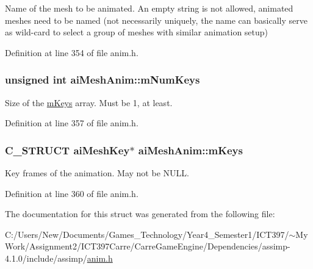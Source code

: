 Name of the mesh to be animated. An empty string is not allowed, animated meshes need to be named (not necessarily uniquely, the name can basically serve as wild-card to select a group of meshes with similar animation setup) 

Definition at line 354 of file anim.h.\hypertarget{structai_mesh_anim_a8702d42bf619ccc8414a556f41634d8}{
\subsubsection[mNumKeys]{\setlength{\rightskip}{0pt plus 5cm}unsigned int {\bf aiMeshAnim::mNumKeys}}}
\label{structai_mesh_anim_a8702d42bf619ccc8414a556f41634d8}


Size of the \hyperlink{structai_mesh_anim_bc78e9f6d7583c541447e8c389488f1b}{mKeys} array. Must be 1, at least. 

Definition at line 357 of file anim.h.\hypertarget{structai_mesh_anim_bc78e9f6d7583c541447e8c389488f1b}{
\subsubsection[mKeys]{\setlength{\rightskip}{0pt plus 5cm}C\_\-STRUCT {\bf aiMeshKey}$\ast$ {\bf aiMeshAnim::mKeys}}}
\label{structai_mesh_anim_bc78e9f6d7583c541447e8c389488f1b}


Key frames of the animation. May not be NULL. 

Definition at line 360 of file anim.h.

The documentation for this struct was generated from the following file:\begin{CompactItemize}
\item 
C:/Users/New/Documents/Games\_\-Technology/Year4\_\-Semester1/ICT397/$\sim$My Work/Assignment2/ICT397Carre/CarreGameEngine/Dependencies/assimp-4.1.0/include/assimp/\hyperlink{anim_8h}{anim.h}\end{CompactItemize}
